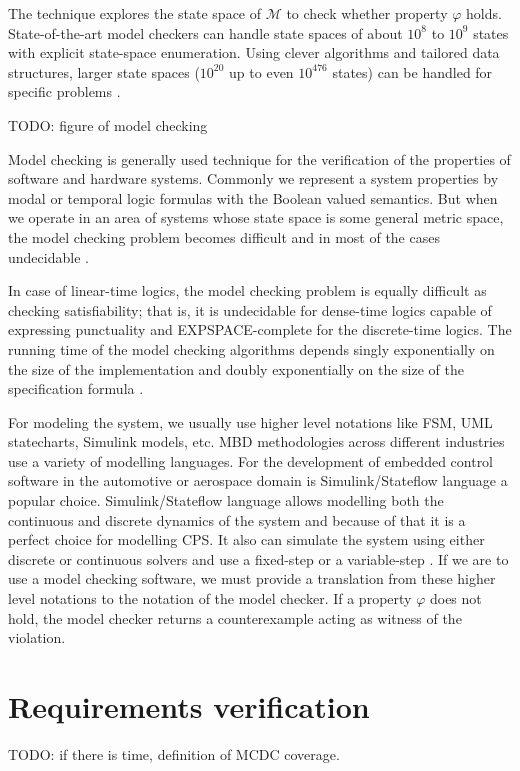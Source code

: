 The technique explores the state space of $\mathcal{M}$ to check whether property $\varphi$ holds. State-of-the-art model checkers can handle state spaces of about $10^8$ to $10^9$ states with explicit state-space enumeration. Using clever algorithms and tailored data structures, larger state spaces ($10^{20}$ up to even $10^{476}$ states) can be handled for specific problems \cite{Baier:ModelChecking}.

TODO: figure of model checking

Model checking is generally used technique for the verification of the properties of software and hardware systems. Commonly we represent a system properties by modal or temporal logic formulas with the Boolean valued semantics. But when we operate in an area of systems whose state space is some general metric space, the model checking problem becomes difficult and in most of the cases undecidable \cite{Fainekos:RobustnessContinuousTime}.

In case of linear-time logics, the model checking problem is equally difficult as checking satisfiability; that is, it is undecidable for dense-time logics capable of expressing punctuality and EXPSPACE-complete for the discrete-time logics. The running time of the model checking algorithms depends singly exponentially on the size of the implementation and doubly exponentially on the size of the specification formula \cite{Rajeev:ModelsOfRealTime}.

For modeling the system, we usually use higher level notations like FSM, UML statecharts, Simulink models, etc. MBD methodologies across different industries use a variety of modelling languages. For the development of embedded control software in the automotive or aerospace domain is Simulink/Stateflow language a popular choice. Simulink/Stateflow language allows modelling both the continuous and discrete dynamics of the system and because of that it is a perfect choice for modelling CPS. It also can simulate the system using either discrete or continuous solvers and use a fixed-step or a variable-step \cite{Mohalik:ModelCheckingSimulink}. If we are to use a model checking software, we must provide a translation from these higher level notations to the notation of the model checker. If a property $\varphi$ does not hold, the model checker returns a counterexample acting as witness of the violation.

\section{Requirements verification}
TODO: if there is time, definition of MCDC coverage.

